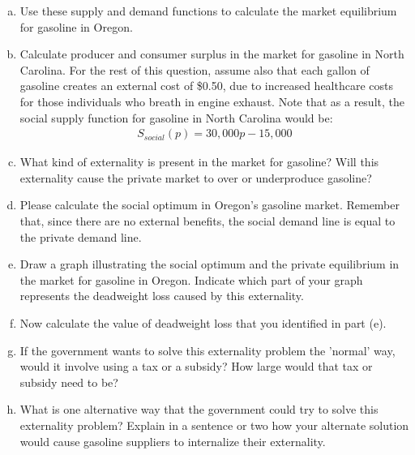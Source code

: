 \documentclass{article}
\begin{document}
\begin{enumerate}[(a)]
    \item Use these supply and demand functions to calculate the market equilibrium for gasoline in Oregon.
    
    \item Calculate producer and consumer surplus in the market for gasoline in North Carolina. For the rest of this question, assume also that each gallon of gasoline creates an external cost of \$0.50, due to increased healthcare     costs for those individuals who breath in engine exhaust. Note that as a result, the social supply function for gasoline in North Carolina would be:
    \begin{align*}
        S_{social}(p) = 30,000p - 15,000
    \end{align*}
    \item What kind of externality is present in the market for gasoline? Will this externality cause the private market to over or underproduce gasoline?
    \item Please calculate the social optimum in Oregon's gasoline market. Remember that, since there are no external benefits, the social demand line is equal to the private demand line.
    \item Draw a graph illustrating the social optimum and the private equilibrium in the market for gasoline in Oregon. Indicate which part of your graph represents the deadweight loss caused by this externality.
    \item Now calculate the value of deadweight loss that you identified in part (e).
    \item If the government wants to solve this externality problem the 'normal' way, would it involve using a tax or a subsidy? How large would that tax or subsidy need to be?
    \item What is one alternative way that the government could try to solve this externality problem? Explain in a sentence or two how your alternate solution would cause gasoline suppliers to internalize their externality.

\end{enumerate}
\end{document}
